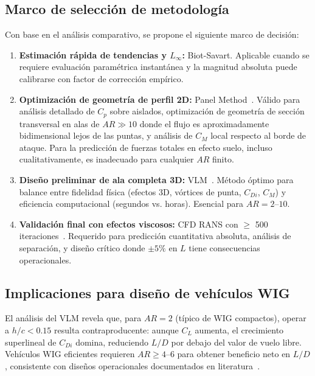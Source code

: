 \documentclass[twocolumn]{article}
\begin{document}
\subsection{Marco de selección de metodología}

Con base en el análisis comparativo, se propone el siguiente marco de decisión:

\begin{enumerate}
    \item \textbf{Estimación rápida de tendencias y $L_\infty$:} Biot-Savart. Aplicable cuando se requiere evaluación paramétrica instantánea y la magnitud absoluta puede calibrarse con factor de corrección empírico.
    
    \item \textbf{Optimización de geometría de perfil 2D:} Panel Method~\cite{hess1967}. Válido para análisis detallado de $C_p$ sobre aislados, optimización de geometría de sección transversal en alas de $\mathit{AR} \gg 10$ donde el flujo es aproximadamente bidimensional lejos de las puntas, y análisis de $C_M$ local respecto al borde de ataque. Para la predicción de fuerzas totales en efecto suelo, incluso cualitativamente, es inadecuado para cualquier $\mathit{AR}$ finito.
    
    \item \textbf{Diseño preliminar de ala completa 3D:} VLM~\cite{katz2001}. Método óptimo para balance entre fidelidad física (efectos 3D, vórtices de punta, $C_{Di}$, $C_M$) y eficiencia computacional (segundos vs. horas). Esencial para $AR = 2$--$10$.
    
    \item \textbf{Validación final con efectos viscosos:} CFD RANS con $\geq$ 500 iteraciones~\cite{versteeg2007}. Requerido para predicción cuantitativa absoluta, análisis de separación, y diseño crítico donde $\pm 5\%$ en $L$ tiene consecuencias operacionales.
\end{enumerate}

\subsection{Implicaciones para diseño de vehículos WIG}

El análisis del VLM revela que, para $AR = 2$ (típico de WIG compactos), operar a $h/c < 0.15$ resulta contraproducente: aunque $C_L$ aumenta, el crecimiento superlineal de $C_{Di}$ domina, reduciendo $L/D$ por debajo del valor de vuelo libre. Vehículos WIG eficientes requieren $AR \geq 4$--$6$ para obtener beneficio neto en $L/D$, consistente con diseños operacionales documentados en literatura~\cite{rozhdestvensky2006}.
\end{document}

